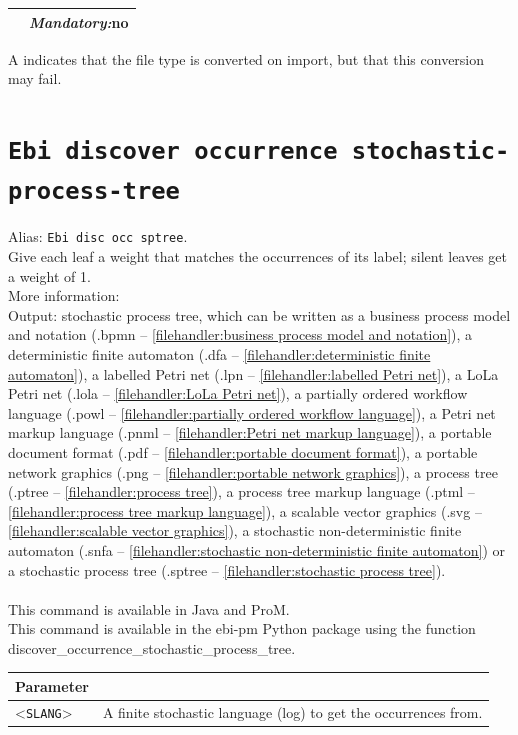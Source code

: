 {\begin{tabularx}{\linewidth}{lX}
&\textit{Mandatory:}\quad no\\
\bottomrule
\end{tabularx}
A \textdagger{} indicates that the file type is converted on import, but that this conversion may fail.
\clearpage\section{\texttt{Ebi discover occurrence stochastic-process-tree}}
\label{command:Ebi discover occurrence stochastic-process-tree}
Alias: \texttt{Ebi disc occ sptree}.\\
Give each leaf a weight that matches the occurrences of its label; silent leaves get a weight of 1.\\
More information: ~\cite{DBLP:conf/icpm/BurkeLW20}~\\
\noindent Output: stochastic process tree, which can be written as a business process model and notation (.bpmn -- \cref{filehandler:business process model and notation}), a deterministic finite automaton (.dfa -- \cref{filehandler:deterministic finite automaton}), a labelled Petri net (.lpn -- \cref{filehandler:labelled Petri net}), a LoLa Petri net (.lola -- \cref{filehandler:LoLa Petri net}), a partially ordered workflow language (.powl -- \cref{filehandler:partially ordered workflow language}), a Petri net markup language (.pnml -- \cref{filehandler:Petri net markup language}), a portable document format (.pdf -- \cref{filehandler:portable document format}), a portable network graphics (.png -- \cref{filehandler:portable network graphics}), a process tree (.ptree -- \cref{filehandler:process tree}), a process tree markup language (.ptml -- \cref{filehandler:process tree markup language}), a scalable vector graphics (.svg -- \cref{filehandler:scalable vector graphics}), a stochastic non-deterministic finite automaton (.snfa -- \cref{filehandler:stochastic non-deterministic finite automaton}) or a stochastic process tree (.sptree -- \cref{filehandler:stochastic process tree}).\\
\\This command is available in Java and ProM.
\\This command is available in the ebi-pm Python package using the function discover\_occurrence\_stochastic\_process\_tree.
\begin{tabularx}{\linewidth}{lX}
\toprule
Parameter \\\midrule
<\texttt{SLANG}>&A finite stochastic language (log) to get the occurrences from.\\

\end{tabularx}}
